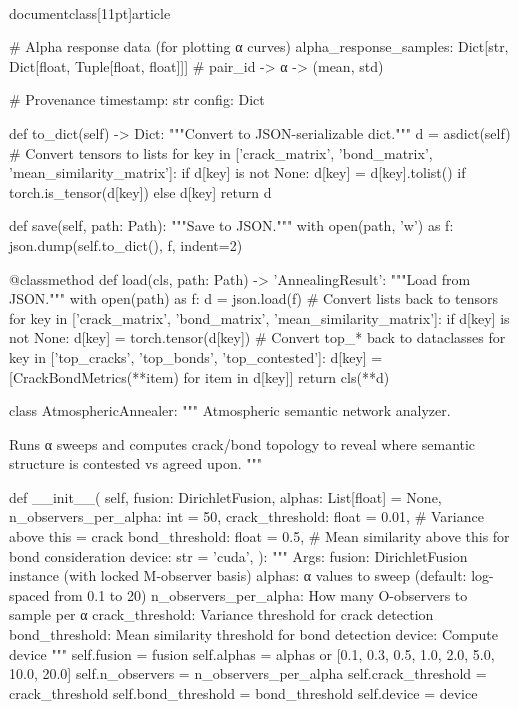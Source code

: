 \\documentclass[11pt]{article}
\begin{document}
\begin{CodeBlock}
{{{{{{{{    # Alpha response data (for plotting α curves)
    alpha_response_samples: Dict[str, Dict[float, Tuple[float, float]]]  # pair_id -> α -> (mean, std)
    
    # Provenance
    timestamp: str
    config: Dict
    
    def to_dict(self) -> Dict:
        """Convert to JSON-serializable dict."""
        d = asdict(self)
        # Convert tensors to lists
        for key in ['crack_matrix', 'bond_matrix', 'mean_similarity_matrix']:
            if d[key] is not None:
                d[key] = d[key].tolist() if torch.is_tensor(d[key]) else d[key]
        return d
    
    def save(self, path: Path):
        """Save to JSON."""
        with open(path, 'w') as f:
            json.dump(self.to_dict(), f, indent=2)
    
    @classmethod
    def load(cls, path: Path) -> 'AnnealingResult':
        """Load from JSON."""
        with open(path) as f:
            d = json.load(f)
        # Convert lists back to tensors
        for key in ['crack_matrix', 'bond_matrix', 'mean_similarity_matrix']:
            if d[key] is not None:
                d[key] = torch.tensor(d[key])
        # Convert top_* back to dataclasses
        for key in ['top_cracks', 'top_bonds', 'top_contested']:
            d[key] = [CrackBondMetrics(**item) for item in d[key]]
        return cls(**d)


class AtmosphericAnnealer:
    """
    Atmospheric semantic network analyzer.
    
    Runs α sweeps and computes crack/bond topology to reveal
    where semantic structure is contested vs agreed upon.
    """
    
    def __init__(
        self,
        fusion: DirichletFusion,
        alphas: List[float] = None,
        n_observers_per_alpha: int = 50,
        crack_threshold: float = 0.01,    # Variance above this = crack
        bond_threshold: float = 0.5,       # Mean similarity above this for bond consideration
        device: str = 'cuda',
    ):
        """
        Args:
            fusion: DirichletFusion instance (with locked M-observer basis)
            alphas: α values to sweep (default: log-spaced from 0.1 to 20)
            n_observers_per_alpha: How many O-observers to sample per α
            crack_threshold: Variance threshold for crack detection
            bond_threshold: Mean similarity threshold for bond detection
            device: Compute device
        """
        self.fusion = fusion
        self.alphas = alphas or [0.1, 0.3, 0.5, 1.0, 2.0, 5.0, 10.0, 20.0]
        self.n_observers = n_observers_per_alpha
        self.crack_threshold = crack_threshold
        self.bond_threshold = bond_threshold
        self.device = device
    
}}}}}}}}
\end{CodeBlock}
\end{document}
